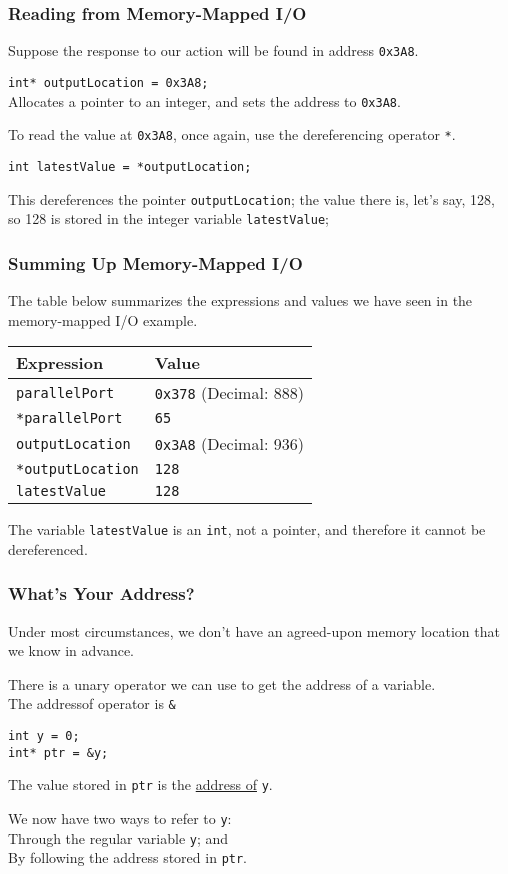 \begin{frame}
\frametitle{Reading from Memory-Mapped I/O}
Suppose the response to our action will be found in address \texttt{0x3A8}.

\texttt{int* outputLocation = 0x3A8;}\\
\quad Allocates a pointer to an integer, and sets the address to \texttt{0x3A8}.

To read the value at \texttt{0x3A8}, once again, use the dereferencing operator \texttt{*}.

\texttt{int latestValue = *outputLocation;}

This dereferences the pointer \texttt{outputLocation}; the value there is, let's say, 128, so 128 is stored in the integer variable \texttt{latestValue};

\end{frame}

\begin{frame}
\frametitle{Summing Up Memory-Mapped I/O}

The table below summarizes the expressions and values we have seen in the memory-mapped I/O example.

\begin{center}
\begin{tabular}{l|l}
	\textbf{Expression} & \textbf{Value} \\ \hline
	\texttt{parallelPort} & \texttt{0x378} (Decimal: 888) \\ \hline
	\texttt{*parallelPort} & \texttt{65}\\ \hline
	\texttt{outputLocation} & \texttt{0x3A8} (Decimal: 936) \\ \hline
	\texttt{*outputLocation} & \texttt{128}\\ \hline
	\texttt{latestValue} & \texttt{128}\\
\end{tabular}
\end{center}

The variable \texttt{latestValue} is an \texttt{int}, not a pointer, and therefore it cannot be dereferenced.

\end{frame}

\begin{frame}
\frametitle{What's Your Address?}
Under most circumstances, we don't have an agreed-upon memory location that we know in advance.

There is a unary operator we can use to get the address of a variable.\\
\quad The addressof operator is \texttt{\&}

\texttt{int y = 0;\\
int* ptr = \&y;}

The value stored in \texttt{ptr} is the \underline{address of} \texttt{y}.

We now have two ways to refer to \texttt{y}:\\
\quad Through the regular variable \texttt{y}; and\\
\quad By following the address stored in \texttt{ptr}.

\end{frame}

